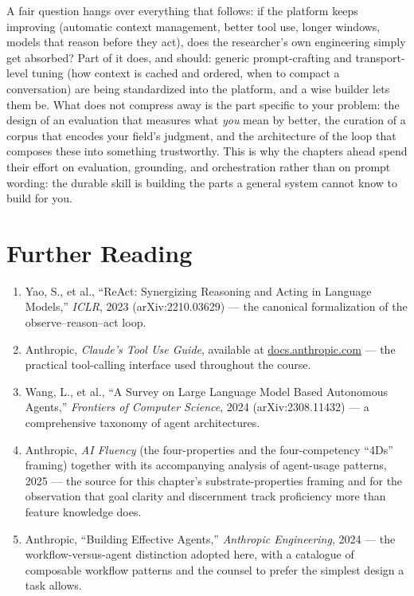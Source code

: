 \begin{remark}
A fair question hangs over everything that follows: if the platform keeps improving (automatic context management, better tool use, longer windows, models that reason before they act), does the researcher's own engineering simply get absorbed?
Part of it does, and should: generic prompt-crafting and transport-level tuning (how context is cached and ordered, when to compact a conversation) are being standardized into the platform, and a wise builder lets them be.
What does not compress away is the part specific to your problem: the design of an evaluation that measures what \emph{you} mean by better, the curation of a corpus that encodes your field's judgment, and the architecture of the loop that composes these into something trustworthy.
This is why the chapters ahead spend their effort on evaluation, grounding, and orchestration rather than on prompt wording: the durable skill is building the parts a general system cannot know to build for you.
\end{remark}

\section*{Further Reading}

\begin{small}
\begin{enumerate}
\item Yao, S., et al., ``ReAct: Synergizing Reasoning and Acting in Language Models,'' \emph{ICLR}, 2023 (arXiv:2210.03629) — the canonical formalization of the observe–reason–act loop.
\item Anthropic, \emph{Claude's Tool Use Guide}, available at \href{https://docs.anthropic.com}{docs.anthropic.com} — the practical tool-calling interface used throughout the course.
\item Wang, L., et al., ``A Survey on Large Language Model Based Autonomous Agents,'' \emph{Frontiers of Computer Science}, 2024 (arXiv:2308.11432) — a comprehensive taxonomy of agent architectures.
\item Anthropic, \emph{AI Fluency} (the four-properties and the four-competency ``4Ds'' framing) together with its accompanying analysis of agent-usage patterns, 2025 — the source for this chapter's substrate-properties framing and for the observation that goal clarity and discernment track proficiency more than feature knowledge does.
\item Anthropic, ``Building Effective Agents,'' \emph{Anthropic Engineering}, 2024 — the workflow-versus-agent distinction adopted here, with a catalogue of composable workflow patterns and the counsel to prefer the simplest design a task allows.
\end{enumerate}
\end{small}
